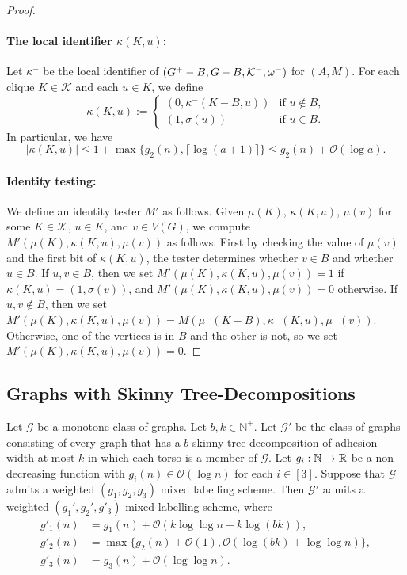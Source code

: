 \documentclass{patmorin}
\renewcommand{\le}{\leqslant}
\newcommand{\NN}{\mathbb{N}}
\newcommand{\Oh}{\calO}
\newcommand{\calG}{\mathcal{G}}
\newcommand{\calK}{\mathcal{K}}
\newcommand{\calO}{\mathcal{O}}
\begin{document}
\begin{proof}
  \paragraph{\boldmath The local identifier $\kappa(K,u)$:} 
  Let $\kappa^-$ be the local identifier of $(G^+-B,G-B,\cal{K}^-,\omega^-)$ for $(A,M)$.
   For each clique $K\in\calK$ and each $u\in K$, we define 
  \[
     \kappa(K,u) :=
     \begin{cases}
       (0,\kappa^-(K-B,u)) & \text{if $u\not\in B$,} \\
       (1,\sigma(u)) & \text{if $u\in B$.}
     \end{cases}
  \]
  In particular, we have 
  \[
  |\kappa(K,u)|\le 1+ \max\{g_2(n), \lceil\log(a+1)\rceil\}\le g_2(n)+\Oh(\log a).
  \]

  \paragraph{Identity testing:} 
  We define an identity tester $M'$ as follows. 
  Given $\mu(K)$, $\kappa(K,u)$, $\mu(v)$ for some $K\in\calK$, $u\in K$, and  $v\in V(G)$, 
  we compute $M'(\mu(K),\kappa(K,u),\mu(v))$ as follows. 
  First by checking the value of $\mu(v)$ and the first bit of $\kappa(K,u)$, the tester determines whether $v\in B$ and whether $u\in B$.
  If $u,v\in B$, then we set $M'(\mu(K),\kappa(K,u),\mu(v))=1$ if $\kappa(K,u)=(1,\sigma(v))$, and $M'(\mu(K),\kappa(K,u),\mu(v))=0$ otherwise.
  If $u,v\not\in B$, then we set 
  $M'(\mu(K),\kappa(K,u),\mu(v)) = M(\mu^-(K-B),\kappa^-(K,u),\mu^-(v))$. 
  Otherwise, one of the vertices is in $B$ and the other is not, so we set $M'(\mu(K),\kappa(K,u),\mu(v)) =0$.
  \qedhere
\end{proof}


\subsection{Graphs with Skinny Tree-Decompositions}

  \begin{lem}\label{skinny_labelling}
    Let $\calG$ be a monotone class of graphs. 
    Let $b, k\in\NN^+$. 
    Let $\calG'$ be the class of graphs consisting of every graph that has a $b$-skinny tree-decomposition of adhesion-width at most $k$ in which each torso is a member of $\calG$.
    Let $g_i:\mathbb{N}\to\mathbb{R}$ be a non-decreasing function with $g_i(n)\in \Oh(\log n)$ for each $i\in[3]$.   
    Suppose that $\calG$ admits a weighted $(g_1,g_2,g_3)$ mixed labelling scheme. 
    Then $\calG'$ admits a weighted $(g_1',g_2',g'_3)$ mixed labelling scheme, where
    \begin{align*}
     g'_1(n) & = g_1(n) + \Oh(k\log\log n + k\log (bk)),  \\
     g'_2(n) & = \max\{g_2(n)+\Oh(1), \Oh(\log(bk)+\log\log n)\}, \\
     g'_3(n) & = g_3(n) + \Oh(\log\log n) .
     \end{align*}
  \end{lem}
\end{document}
